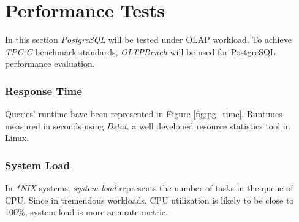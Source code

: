 \documentclass[report.tex]{subfiles}
\begin{document}
\section{Performance Tests}

In this section \textit{PostgreSQL}\cite{postgres} will be tested under OLAP workload. To achieve \textit{TPC-C}\cite{tpcc} benchmark standards, \textit{OLTPBench}\cite{oltpbench} will be used for PostgreSQL performance evaluation.

\subsubsection{Response Time}
Queries' runtime have been represented in Figure \ref{fig:pg_time}. Runtimes measured in seconds using \textit{Dstat}\cite{dstat}, a well developed resource statistics tool in Linux.


\subsubsection{System Load}
In \textit{*NIX} systems, \textit{system load} represents the number of tasks in the queue of CPU. Since in tremendous workloads, CPU utilization is likely to be close to 100\%, system load is more accurate metric.
\end{document}
